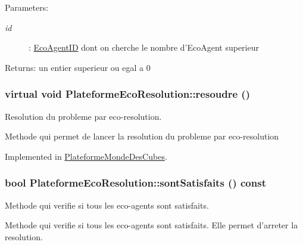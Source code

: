 \begin{Desc}
\item[Parameters:]
\begin{description}
\item[{\em id}]: \hyperlink{classEcoAgentID}{EcoAgentID} dont on cherche le nombre d'EcoAgent superieur \end{description}
\end{Desc}
\begin{Desc}
\item[Returns:]un entier superieur ou egal a 0 \end{Desc}
\hypertarget{classPlateformeEcoResolution_17f587580cd8aee537551bc0ddd82bef}{
\subsubsection[{resoudre}]{\setlength{\rightskip}{0pt plus 5cm}virtual void PlateformeEcoResolution::resoudre ()}}
\label{classPlateformeEcoResolution_17f587580cd8aee537551bc0ddd82bef}


Resolution du probleme par eco-resolution. 

Methode qui permet de lancer la resolution du probleme par eco-resolution 

Implemented in \hyperlink{classPlateformeMondeDesCubes_c7be18c8d02e2743e884545828cfabed}{PlateformeMondeDesCubes}.\hypertarget{classPlateformeEcoResolution_673b4d17360ab1ff1e7c7f28a1b2e35e}{
\subsubsection[{sontSatisfaits}]{\setlength{\rightskip}{0pt plus 5cm}bool PlateformeEcoResolution::sontSatisfaits () const}}
\label{classPlateformeEcoResolution_673b4d17360ab1ff1e7c7f28a1b2e35e}


Methode qui verifie si tous les eco-agents sont satisfaits. 

Methode qui verifie si tous les eco-agents sont satisfaits. Elle permet d'arreter la resolution.

